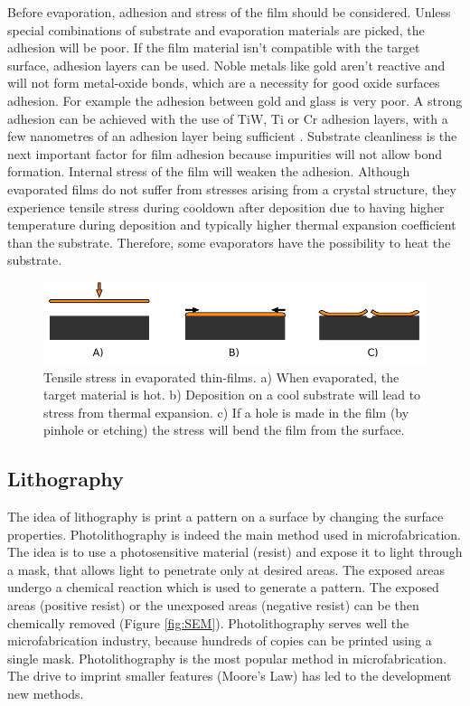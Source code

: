 \documentclass[final]{jyflluk}
\begin{document}
Before evaporation, adhesion and stress of the film should be considered. Unless special combinations of substrate and evaporation materials are picked, the adhesion will be poor. If the film material isn’t compatible with the target surface, adhesion layers can be used. Noble metals like gold aren’t reactive and will not form metal-oxide bonds, which are a necessity for good oxide surfaces adhesion. For example the adhesion between gold and glass is very poor. A strong adhesion can be achieved with the use of $\mathrm{TiW}$, $\mathrm{Ti}$ or $\mathrm{Cr}$ adhesion layers, with a few nanometres of an adhesion layer being sufficient \cite{chen2013study}. Substrate cleanliness is the next important factor for film adhesion because impurities will not allow bond formation. Internal stress of the film will weaken the adhesion. Although evaporated films do not suffer from stresses arising from a crystal structure, they experience tensile stress during cooldown after deposition due to having higher temperature during deposition and typically higher thermal expansion coefficient than the substrate.  Therefore, some evaporators have the possibility to heat the substrate. \cite{franssila2010introduction}

\begin{figure}[h]
    \centering
    \includegraphics[width=1.0\textwidth]{images/tensile.pdf}
    \caption{Tensile stress in evaporated thin-films. a) When evaporated, the target material is hot. b) Deposition on a cool substrate will lead to stress from thermal expansion. c) If a hole is made in the film (by pinhole or etching) the stress will bend the film from the surface.}
    \label{fig:stresa}
\end{figure}

\subsection{Lithography}
\label{sec:xx3}

The idea of lithography is print a pattern on a surface by changing the surface properties.  Photolithography is indeed the main method used in microfabrication. The idea is to use a photosensitive material (resist) and expose it to light through a mask, that allows light to penetrate only at desired areas. The exposed areas undergo a chemical reaction which is used to generate a pattern. The exposed areas (positive resist) or the unexposed areas (negative resist) can be then chemically removed (Figure \ref{fig:SEM}).  Photolithography serves well the microfabrication industry, because hundreds of copies can be printed using a single mask. Photolithography is the most popular method in microfabrication. The drive to imprint smaller features (Moore’s Law) has led to the development new methods.
\cite{franssila2010introduction, lee2010microfabrication}
\end{document}

